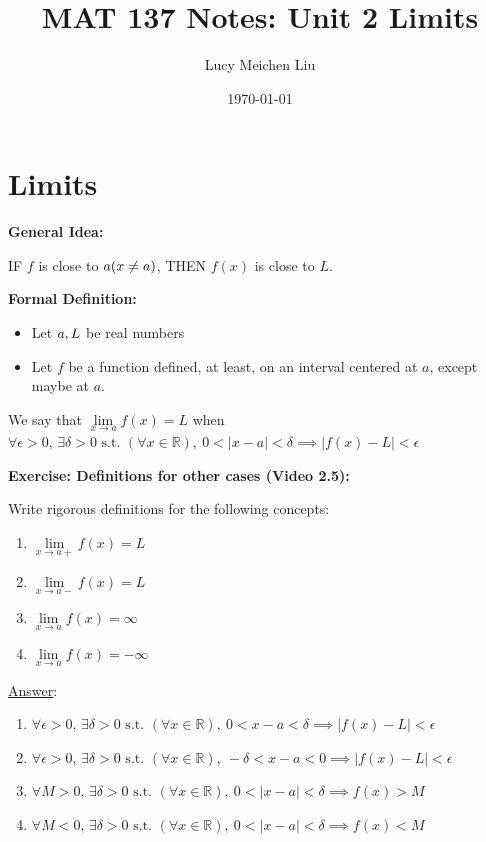 \documentclass[11pt]{article}
\title{MAT 137 Notes: Unit 2 Limits}
\author{Lucy Meichen Liu}
\date{\today}
\newcommand{\R}{\mathbb{R}}
\begin{document}
\maketitle

\section{Limits}

\textbf{General Idea:}

IF \(f\) is close to \(a \space (x \neq a)\), THEN \(f(x)\) is close to \(L\).
\bigskip

\noindent
\textbf{Formal Definition:}
\begin{itemize}
    \item Let \(a, \space L\) be real numbers
    \item Let \(f\) be a function defined, at least, on an interval centered at \(a\), except maybe at \(a\).
\end{itemize}

We say that $\lim\limits_{x \to a} f(x) = L$ when \(\forall \epsilon > 0, \, \exists \delta > 0 \text{ s.t. } (\forall x \in \R), \ 0 < |x - a| < \delta \implies |f(x) - L| < \epsilon\)
\bigskip

\noindent
\textbf{Exercise: Definitions for other cases (Video 2.5):}

Write rigorous definitions for the following concepts:
\begin{enumerate}
    \item $\lim\limits_{x \to a+} f(x) = L$
    \item $\lim\limits_{x \to a-} f(x) = L$
    \item $\lim\limits_{x \to a} f(x) = \infty$
    \item $\lim\limits_{x \to a} f(x) = - \infty$
\end{enumerate}
\bigskip

\underline{Answer}:
\begin{enumerate}
    \item \(\forall \epsilon > 0, \, \exists \delta > 0 \text{ s.t. } (\forall x \in \R), \ 0 < x - a < \delta \implies |f(x) - L| < \epsilon\)
    \item \(\forall \epsilon > 0, \, \exists \delta > 0 \text{ s.t. } (\forall x \in \R), \ -\delta < x - a < 0 \implies |f(x) - L| < \epsilon\)
    \item \(\forall M > 0, \, \exists \delta > 0 \text{ s.t. } (\forall x \in \R), \ 0 < |x - a| < \delta \implies f(x) > M\)
    \item \(\forall M < 0, \, \exists \delta > 0 \text{ s.t. } (\forall x \in \R), \ 0 < |x - a| < \delta \implies f(x) < M\)
\end{enumerate}
\end{document}
